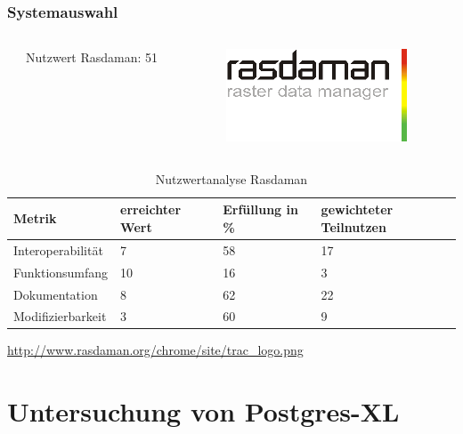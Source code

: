 \documentclass{beamer}
\begin{document}
\begin{frame}\frametitle{Systemauswahl}

   \begin{columns}
    \begin{column}{.5\textwidth}
\ \ \ Nutzwert Rasdaman: 51
    \end{column}
    \begin{column}{.5\textwidth}
    \includegraphics[width=.6\hsize]{rasdaman.png}
    \end{column}
  \end{columns}

\begin{table}
\begin{tabular}{|l|p{1.8cm}|l|p{1.9cm}|}
\hline
\textbf{Metrik} & \textbf{erreichter Wert} & \textbf{Erfüllung in \%} & \textbf{gewichteter Teilnutzen} \\ \hline
Interoperabilität & 7 & 58 & 17 \\ \hline
Funktionsumfang & 10 & 16 & 3 \\ \hline
Dokumentation & 8 & 62 & 22 \\ \hline
Modifizierbarkeit & 3 & 60 & 9 \\ \hline
\end{tabular}
\caption{Nutzwertanalyse Rasdaman}
\end{table}

\begin{center}
\tiny
\url{http://www.rasdaman.org/chrome/site/trac_logo.png}
\end{center}

\end{frame}

\section{Untersuchung von Postgres-XL}
\end{document}
